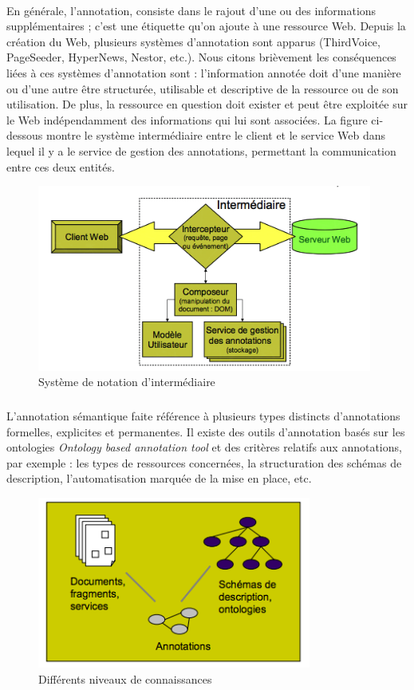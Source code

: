 \paragraph{}
En générale, l'annotation, consiste dans le rajout d'une ou des informations supplémentaires ; c'est une étiquette qu'on ajoute à une ressource Web. Depuis la création du Web, plusieurs systèmes d'annotation sont apparus (ThirdVoice, PageSeeder, HyperNews, Nestor, etc.).
Nous citons brièvement les conséquences liées à ces systèmes d'annotation sont : l'information annotée doit d'une manière ou d'une autre être structurée, utilisable et descriptive de la ressource ou de son utilisation. De plus, la ressource en question doit exister et peut être exploitée sur le Web indépendamment des informations qui lui sont associées. La figure ci-dessous montre le système intermédiaire entre le client et le service Web dans lequel il y a le service de gestion des annotations, permettant la communication entre ces deux entités.
\begin{figure}[H]
\centering
\includegraphics[width=11cm]{AnnotationSys.png}
\caption{Système de notation d'intermédiaire}
\end{figure}
\subparagraph{}
L'annotation sémantique faite référence à plusieurs types distincts d'annotations formelles, explicites et permanentes. Il existe des outils d'annotation basés sur les ontologies {\it Ontology based annotation tool}
et des critères relatifs aux annotations, par exemple : les types de ressources concernées, la structuration des schémas de description, l'automatisation marquée de la mise en place, etc.
\begin{figure}[H]
\centering
\includegraphics[width=9cm]{diffConnaissances.png}
\caption{Différents niveaux de connaissances}
\end{figure}
